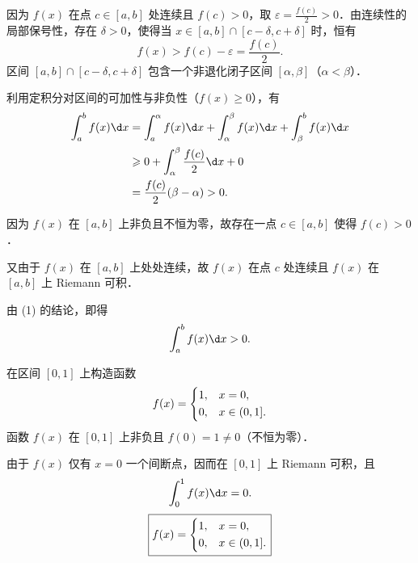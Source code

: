 \begin{solution}

    因为 $f(x)$ 在点 $c \in [a, b]$ 处连续且 $f(c) > 0$，取 $\varepsilon = \frac{f(c)}{2} > 0$．由连续性的局部保号性，存在 $\delta > 0$，使得当 $x \in [a, b] \cap [c - \delta, c + \delta]$ 时，恒有
    \begin{equation}
        f(x) > f(c) - \varepsilon = \frac{f(c)}{2}.
    \end{equation}
    区间 $[a, b] \cap [c - \delta, c + \delta]$ 包含一个非退化闭子区间 $[\alpha, \beta]$（$\alpha < \beta$）．

    利用定积分对区间的可加性与非负性（$f(x) \geqslant 0$），有
    \begin{equation}
        \begin{aligned}
            \int_a^b f(x) \d x & = \int_a^\alpha f(x) \d x + \int_\alpha^\beta f(x) \d x + \int_\beta^b f(x) \d x \\
                               & \geqslant 0 + \int_\alpha^\beta \frac{f(c)}{2} \d x + 0                          \\
                               & = \frac{f(c)}{2}(\beta - \alpha) > 0.
        \end{aligned}
    \end{equation}


    因为 $f(x)$ 在 $[a, b]$ 上非负且不恒为零，故存在一点 $c \in [a, b]$ 使得 $f(c) > 0$．

    又由于 $f(x)$ 在 $[a, b]$ 上处处连续，故 $f(x)$ 在点 $c$ 处连续且 $f(x)$ 在 $[a, b]$ 上 Riemann 可积．

    由 (1) 的结论，即得
    \begin{equation}
        \int_a^b f(x) \d x > 0.
    \end{equation}


    在区间 $[0, 1]$ 上构造函数
    \begin{equation}
        f(x) = \begin{dcases} 1, & x = 0, \\ 0, & x \in (0, 1]. \end{dcases}
    \end{equation}
    函数 $f(x)$ 在 $[0, 1]$ 上非负且 $f(0) = 1 \neq 0$（不恒为零）．

    由于 $f(x)$ 仅有 $x = 0$ 一个间断点，因而在 $[0, 1]$ 上 Riemann 可积，且
    \begin{equation}
        \int_0^1 f(x) \d x = 0.
    \end{equation}
    \begin{equation}
        \boxed{f(x) = \begin{dcases} 1, & x = 0, \\ 0, & x \in (0, 1]. \end{dcases}}
    \end{equation}
\end{solution}

